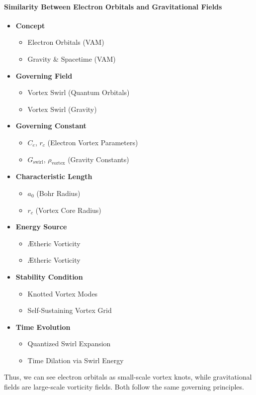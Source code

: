 \paragraph{Similarity Between Electron Orbitals and Gravitational Fields}
\begin{itemize}
    \item \textbf{Concept}
    \begin{itemize}
        \item Electron Orbitals (VAM)
        \item Gravity \& Spacetime (VAM)
    \end{itemize}
    \item \textbf{Governing Field}
    \begin{itemize}
        \item Vortex Swirl (Quantum Orbitals)
        \item Vortex Swirl (Gravity)
    \end{itemize}
    \item \textbf{Governing Constant}
    \begin{itemize}
        \item $C_e$, $r_c$ (Electron Vortex Parameters)
        \item $ G_\text{swirl}$, $\rho_\text{vortex}$ (Gravity Constants)
    \end{itemize}
    \item \textbf{Characteristic Length}
    \begin{itemize}
        \item $a_0$ (Bohr Radius)
        \item $r_c$ (Vortex Core Radius)
    \end{itemize}
    \item \textbf{Energy Source}
    \begin{itemize}
        \item Ætheric Vorticity
        \item Ætheric Vorticity
    \end{itemize}
    \item \textbf{Stability Condition}
    \begin{itemize}
        \item Knotted Vortex Modes
        \item Self-Sustaining Vortex Grid
    \end{itemize}
    \item \textbf{Time Evolution}
    \begin{itemize}
        \item Quantized Swirl Expansion
        \item Time Dilation via Swirl Energy
    \end{itemize}
\end{itemize}
Thus, we can see electron orbitals as small-scale vortex knots, while gravitational fields are large-scale vorticity fields. Both follow the same governing principles.

